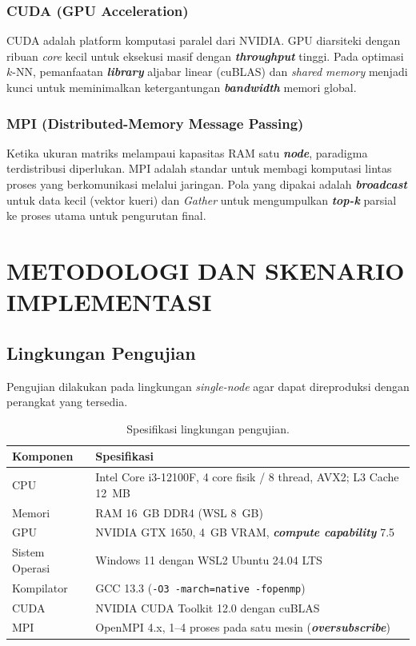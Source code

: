 \documentclass[12pt,a4paper,oneside]{report}
\newcommand{\keyword}[1]{\textbf{\textit{#1}}}
\begin{document}
\subsection{CUDA (GPU Acceleration)}
CUDA adalah platform komputasi paralel dari NVIDIA. GPU diarsiteki dengan ribuan \textit{core} kecil untuk eksekusi masif dengan \keyword{throughput} tinggi. Pada optimasi $k$-NN, pemanfaatan \keyword{library} aljabar linear (cuBLAS) dan \textit{shared memory} menjadi kunci untuk meminimalkan ketergantungan \keyword{bandwidth} memori global.

\subsection{MPI (Distributed-Memory Message Passing)}
Ketika ukuran matriks melampaui kapasitas RAM satu \keyword{node}, paradigma terdistribusi diperlukan. MPI adalah standar untuk membagi komputasi lintas proses yang berkomunikasi melalui jaringan. Pola yang dipakai adalah \keyword{broadcast} untuk data kecil (vektor kueri) dan \textit{Gather} untuk mengumpulkan \keyword{top-k} parsial ke proses utama untuk pengurutan final.

\chapter{METODOLOGI DAN SKENARIO IMPLEMENTASI}

\section{Lingkungan Pengujian}

Pengujian dilakukan pada lingkungan \textit{single-node} agar dapat direproduksi dengan perangkat yang tersedia.

\begin{table}[H]
\centering
\caption{Spesifikasi lingkungan pengujian.}
\label{tab:env}
\begin{tabularx}{\linewidth}{@{}l X@{}}
\toprule
\textbf{Komponen} & \textbf{Spesifikasi}\\
\midrule
CPU & Intel Core i3-12100F, 4 core fisik / 8 thread, AVX2; L3 Cache 12~MB\\
Memori & RAM 16~GB DDR4 (WSL 8~GB)\\
GPU & NVIDIA GTX 1650, 4~GB VRAM, \keyword{compute capability} 7.5\\
Sistem Operasi & Windows 11 dengan WSL2 Ubuntu 24.04 LTS\\
Kompilator & GCC 13.3 (\texttt{-O3 -march=native -fopenmp})\\
CUDA & NVIDIA CUDA Toolkit 12.0 dengan cuBLAS\\
MPI & OpenMPI 4.x, 1--4 proses pada satu mesin (\keyword{oversubscribe})\\
\bottomrule
\end{tabularx}
\end{table}
\end{document}
